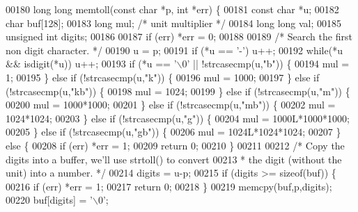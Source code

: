 \begin{DoxyCode}
00180 \textcolor{keywordtype}{long} \textcolor{keywordtype}{long} memtoll(\textcolor{keyword}{const} \textcolor{keywordtype}{char} *p, \textcolor{keywordtype}{int} *err) \{
00181     \textcolor{keyword}{const} \textcolor{keywordtype}{char} *u;
00182     \textcolor{keywordtype}{char} buf[128];
00183     \textcolor{keywordtype}{long} mul; \textcolor{comment}{/* unit multiplier */}
00184     \textcolor{keywordtype}{long} \textcolor{keywordtype}{long} val;
00185     \textcolor{keywordtype}{unsigned} \textcolor{keywordtype}{int} digits;
00186 
00187     \textcolor{keywordflow}{if} (err) *err = 0;
00188 
00189     \textcolor{comment}{/* Search the first non digit character. */}
00190     u = p;
00191     \textcolor{keywordflow}{if} (*u == \textcolor{stringliteral}{'-'}) u++;
00192     \textcolor{keywordflow}{while}(*u && isdigit(*u)) u++;
00193     \textcolor{keywordflow}{if} (*u == \textcolor{stringliteral}{'\(\backslash\)0'} || !strcasecmp(u,\textcolor{stringliteral}{"b"})) \{
00194         mul = 1;
00195     \} \textcolor{keywordflow}{else} \textcolor{keywordflow}{if} (!strcasecmp(u,\textcolor{stringliteral}{"k"})) \{
00196         mul = 1000;
00197     \} \textcolor{keywordflow}{else} \textcolor{keywordflow}{if} (!strcasecmp(u,\textcolor{stringliteral}{"kb"})) \{
00198         mul = 1024;
00199     \} \textcolor{keywordflow}{else} \textcolor{keywordflow}{if} (!strcasecmp(u,\textcolor{stringliteral}{"m"})) \{
00200         mul = 1000*1000;
00201     \} \textcolor{keywordflow}{else} \textcolor{keywordflow}{if} (!strcasecmp(u,\textcolor{stringliteral}{"mb"})) \{
00202         mul = 1024*1024;
00203     \} \textcolor{keywordflow}{else} \textcolor{keywordflow}{if} (!strcasecmp(u,\textcolor{stringliteral}{"g"})) \{
00204         mul = 1000L*1000*1000;
00205     \} \textcolor{keywordflow}{else} \textcolor{keywordflow}{if} (!strcasecmp(u,\textcolor{stringliteral}{"gb"})) \{
00206         mul = 1024L*1024*1024;
00207     \} \textcolor{keywordflow}{else} \{
00208         \textcolor{keywordflow}{if} (err) *err = 1;
00209         \textcolor{keywordflow}{return} 0;
00210     \}
00211 
00212     \textcolor{comment}{/* Copy the digits into a buffer, we'll use strtoll() to convert}
00213 \textcolor{comment}{     * the digit (without the unit) into a number. */}
00214     digits = u-p;
00215     \textcolor{keywordflow}{if} (digits >= \textcolor{keyword}{sizeof}(buf)) \{
00216         \textcolor{keywordflow}{if} (err) *err = 1;
00217         \textcolor{keywordflow}{return} 0;
00218     \}
00219     memcpy(buf,p,digits);
00220     buf[digits] = \textcolor{stringliteral}{'\(\backslash\)0'};

\end{DoxyCode}
